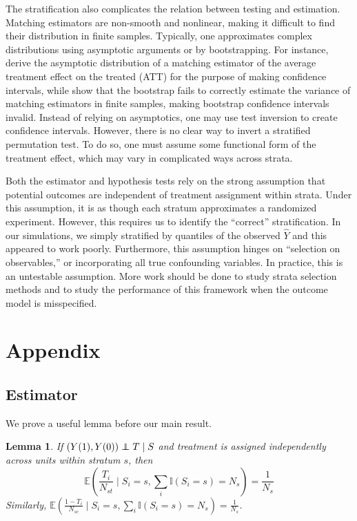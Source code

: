 \documentclass[12pt]{article}
\newtheorem{lemma}[theorem]{Lemma}
\newcommand{\ind}{\mathbb{I}} %
\newcommand{\ex}{\mathbb{E}} %
\newcommand\independent{\protect\mathpalette{\protect\independenT}{\perp}}
\def\independenT#1#2{\mathrel{\rlap{$#1#2$}\mkern2mu{#1#2}}}
\begin{document}
The stratification also complicates the relation between testing and estimation.
Matching estimators are non-smooth and nonlinear, making it difficult to find their distribution in finite samples.
Typically, one approximates complex distributions using asymptotic arguments or by bootstrapping.
For instance, \citet{abadie_large_2006} derive the asymptotic distribution of a matching estimator of the average treatment effect on the treated (ATT) for the purpose of making confidence intervals,
while \citet{abadie_failure_2008} show that the bootstrap fails to correctly estimate the variance of matching estimators in finite samples, making bootstrap confidence intervals invalid.
Instead of relying on asymptotics, one may use test inversion to create confidence intervals.
However, there is no clear way to invert a stratified permutation test.
To do so, one must assume some functional form of the treatment effect, which may vary in complicated ways across strata.

Both the estimator and hypothesis tests rely on the strong assumption that potential outcomes are independent of treatment assignment within strata.
Under this assumption, it is as though each stratum approximates a randomized experiment.
However, this requires us to identify the ``correct'' stratification.
In our simulations, we simply stratified by quantiles of the observed $\hat{Y}$ and this appeared to work poorly.
Furthermore, this assumption hinges on ``selection on observables,'' or incorporating all true confounding variables.
In practice, this is an untestable assumption.
More work should be done to study strata selection methods and to study the performance of this framework when the outcome model is misspecified.

\newpage
\section{Appendix}
\subsection{Estimator}
We prove a useful lemma before our main result.

\begin{lemma}\label{lemma:expectation_treated}
If $(Y(1), Y(0)) \independent T \mid S$ and treatment is assigned independently across units within stratum $s$, then 
$$\ex\left( \frac{T_i}{N_{st}} \mid S_i =s, \sum_{i}\ind{(S_i = s)} = N_s\right) = \frac{1}{N_s}$$
Similarly, $\ex\left(\frac{1-T_i}{N_{sc}} \mid S_i = s, \sum_{i}\ind{(S_i = s)} = N_s\right) = \frac{1}{N_s}$.
\end{lemma}
\end{document}
